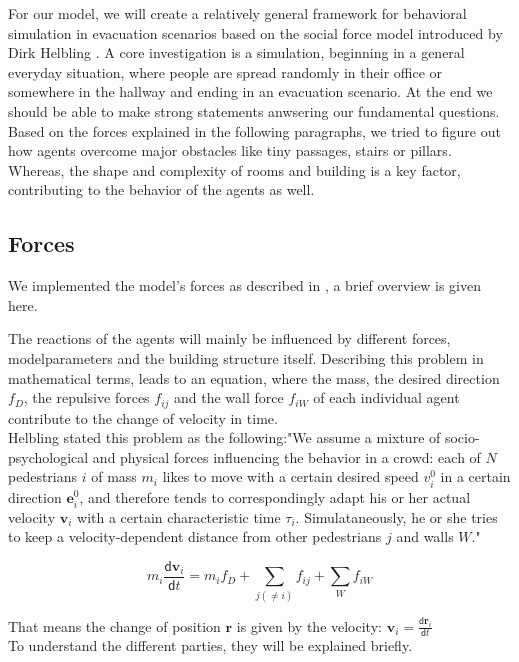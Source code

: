 \documentclass[11pt]{article}
\begin{document}
For our model, we will create a relatively general framework for behavioral
simulation in evacuation scenarios based on the social force model introduced by Dirk Helbling \cite{SDFEP}.
A core investigation is a simulation, beginning in a general everyday situation,
where people are spread randomly in their office or somewhere in the hallway and ending in an evacuation scenario.
At the end we should be able to make strong
statements anwsering our fundamental questions.
Based on the forces explained in the following paragraphs, we tried to figure
out how agents overcome major obstacles like tiny passages, stairs or pillars. Whereas, the
shape and complexity of rooms and building is a key factor, contributing to the behavior of the
agents as well. %

\subsection {Forces}

We implemented the model's forces as described in \cite{SDFEP}, a brief overview is given here.

The reactions of the agents will mainly be influenced by different forces, modelparameters and the building structure itself.
Describing this problem in mathematical terms, leads to an equation, where the mass, the desired direction $f_{D}$, the repulsive forces $f_{ij}$ and the wall force $f_{iW}$ of each individual agent contribute to the change of velocity in time.\\
Helbling stated this problem as the following:"We assume a mixture of socio-psychological and physical forces influencing the behavior in a crowd: each of $N$ pedestrians $i$ of mass $m_{i}$ likes to move with a certain desired speed $v_{i}^0$ in a certain direction $\mathbf{e}_{i}^0$, and therefore tends to correspondingly adapt his or her actual velocity $\mathbf{v}_i$ with a certain characteristic time $\tau_{i}$. Simulataneously, he or she tries to keep a velocity-dependent distance from other pedestrians $j$ and walls $W$."

\begin{equation}
m_{i}\frac{\mathsf{d}\mathbf{v}_{i}}{\mathsf{d}t}=m_{i}f_{D}+\sum \limits_{j(\neq{i})}{f_{ij}}+\sum \limits_{W}{f_{iW}}
\end{equation}

That means the change of position $\mathbf{r}$ is given by the velocity: $\mathbf{v}_{i}=\frac{\mathsf{d}\mathbf{r}_{i}}{\mathsf{d}t}$\\
To understand the different parties, they will be explained briefly.
\end{document}
